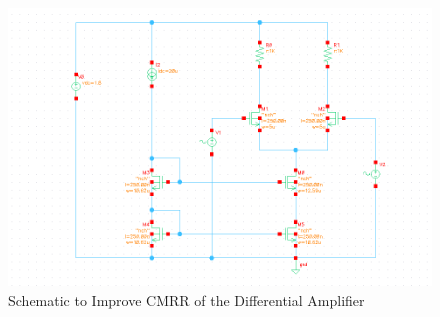 \documentclass{article}
\begin{document}
\begin{figure}[H]
\centering
\includegraphics[width=6in]{p3_5_schem}
\caption{Schematic to Improve CMRR of the Differential Amplifier}
\label{3_5_schem}
\end{figure}
\end{document}
